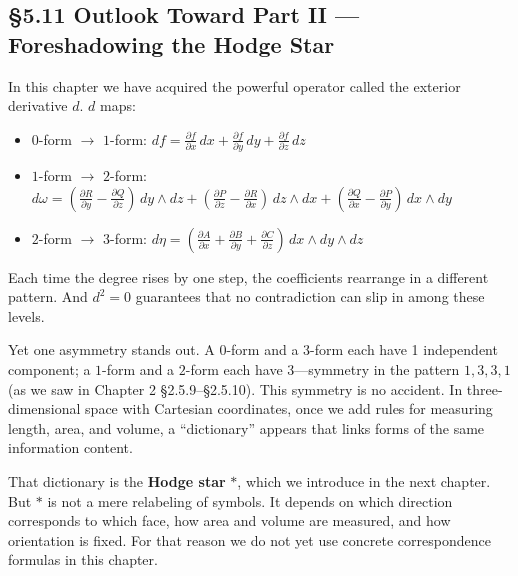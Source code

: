 \documentclass[a4paper,12pt,openany]{book}
\begin{document}
\par\vspace{0.35em}\par

\hypertarget{outlook-toward-part-ii-foreshadowing-the-hodge-star}{%
\subsection{§5.11 Outlook Toward Part II — Foreshadowing the Hodge
Star}\label{outlook-toward-part-ii-foreshadowing-the-hodge-star}}

In this chapter we have acquired the powerful operator called the
exterior derivative \(d\). \(d\) maps:

\begin{itemize}
\item
  \(0\)-form \(\to\) \(1\)-form:
  \(df = \frac{\partial f}{\partial x}\,dx + \frac{\partial f}{\partial y}\,dy + \frac{\partial f}{\partial z}\,dz\)
\item
  \(1\)-form \(\to\) \(2\)-form:
  \(d\omega = (\frac{\partial R}{\partial y}-\frac{\partial Q}{\partial z})\,dy\wedge dz + (\frac{\partial P}{\partial z}-\frac{\partial R}{\partial x})\,dz\wedge dx + (\frac{\partial Q}{\partial x}-\frac{\partial P}{\partial y})\,dx\wedge dy\)
\item
  \(2\)-form \(\to\) \(3\)-form:
  \(d\eta = (\frac{\partial A}{\partial x}+\frac{\partial B}{\partial y}+\frac{\partial C}{\partial z})\,dx\wedge dy\wedge dz\)
\end{itemize}

Each time the degree rises by one step, the coefficients rearrange in a
different pattern. And \(d^2=0\) guarantees that no contradiction can
slip in among these levels.

Yet one asymmetry stands out. A \(0\)-form and a \(3\)-form each have 1
independent component; a \(1\)-form and a \(2\)-form each have
3—symmetry in the pattern \(1, 3, 3, 1\) (as we saw in Chapter 2
§2.5.9–§2.5.10). This symmetry is no accident. In three-dimensional
space with Cartesian coordinates, once we add rules for measuring
length, area, and volume, a ``dictionary'' appears that links forms of
the same information content.

That dictionary is the \textbf{Hodge star} \(\ast\), which we introduce
in the next chapter. But \(\ast\) is not a mere relabeling of symbols.
It depends on which direction corresponds to which face, how area and
volume are measured, and how orientation is fixed. For that reason we do
not yet use concrete correspondence formulas in this chapter.
\end{document}
